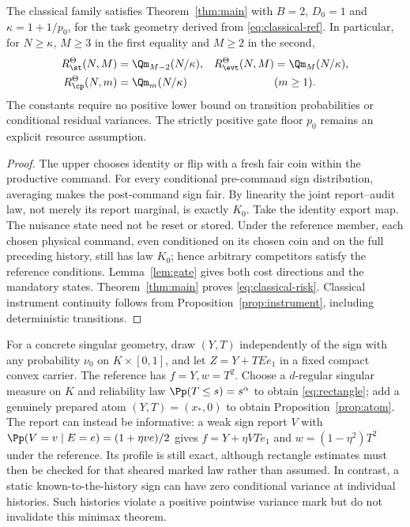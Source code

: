 \begin{theorem}\label{thm:classical}
The classical family satisfies Theorem~\ref{thm:main} with $B=2$, $D_0=1$ and $\kappa=1+1/p_0$, for the task geometry derived from \eqref{eq:classical-ref}. In particular, for $N\ge\kappa$, $M\ge3$ in the first equality and $M\ge2$ in the second,
\begin{equation}\label{eq:classical-risk}
\begin{aligned}
 R_\st^\Theta(N,M)&=\Qm_{M-2}(N/\kappa),&
 R_\evt^\Theta(N,M)&=\Qm_M(N/\kappa),\\
 R_\cp^\Theta(N,m)&=\Qm_m(N/\kappa)&& (m\ge1).
\end{aligned}
\end{equation}
The constants require no positive lower bound on transition probabilities or conditional residual variances. The strictly positive gate floor $p_0$ remains an explicit resource assumption.
\end{theorem}
\begin{proof}
The upper chooses identity or flip with a fresh fair coin within the productive command. For every conditional pre-command sign distribution, averaging makes the post-command sign fair. By linearity the joint report--audit law, not merely its report marginal, is exactly $K_0$. Take the identity export map. The nuisance state need not be reset or stored. Under the reference member, each chosen physical command, even conditioned on its chosen coin and on the full preceding history, still has law $K_0$; hence arbitrary competitors satisfy the reference conditions. Lemma~\ref{lem:gate} gives both cost directions and the mandatory states. Theorem~\ref{thm:main} proves \eqref{eq:classical-risk}. Classical instrument continuity follows from Proposition~\ref{prop:instrument}, including deterministic transitions.
\end{proof}

For a concrete singular geometry, draw $(Y,T)$ independently of the sign with any probability $\nu_0$ on $K\times[0,1]$, and let $Z=Y+TEe_1$ in a fixed compact convex carrier. The reference has $f=Y,w=T^2$. Choose a $d$-regular singular measure on $K$ and reliability law $\Pp(T\le s)=s^\alpha$ to obtain \eqref{eq:rectangle}; add a genuinely prepared atom $(Y,T)=(x_*,0)$ to obtain Proposition~\ref{prop:atom}. The report can instead be informative: a weak sign report $V$ with $\Pp(V=v\mid E=e)=(1+\eta ve)/2$ gives $f=Y+\eta VT e_1$ and $w=(1-\eta^2)T^2$ under the reference. Its profile is still exact, although rectangle estimates must then be checked for that sheared marked law rather than assumed. In contrast, a static known-to-the-history sign can have zero conditional variance at individual histories. Such histories violate a positive pointwise variance mark but do not invalidate this minimax theorem.

